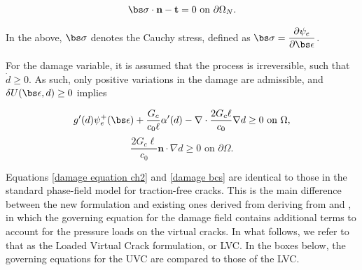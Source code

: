 \begin{equation}\label{disp bcs}
    \bs\sigma \cdot \textbf{n} - \textbf{t} = 0 \text{ on }\partial\Omega_N.
\end{equation}

\noindent In the above, $\bs\sigma$ denotes the Cauchy stress, defined as $\bs\sigma = \dfrac{\partial\psi_e}{\partial \bs \epsilon}$. 

For the damage variable, it is assumed that the process is irreversible, such that $\dot{d} \ge 0$.  As such, only positive variations in the damage are admissible, and $\delta U(\bs\epsilon, d) \ge 0$ implies

\begin{equation}\label{damage equation ch2}
    g'(d) \psi_e^+(\bs\epsilon)
    + \dfrac{G_c}{c_0\ell}\alpha'(d) - \nabla \cdot \dfrac{2G_c\ell}{c_0}\nabla d \ge 0 \text{ on }\Omega,
\end{equation}
\begin{equation}\label{damage bcs}
    \dfrac{2G_c\ell}{c_0}\textbf{n}\cdot \nabla d \ge 0 \text{ on }\partial\Omega.
\end{equation}

\noindent Equations \eqref{damage equation ch2} and \eqref{damage bcs} are identical to those in the standard phase-field model for traction-free cracks. This is the main difference between the new formulation and existing ones derived from deriving from \cite{bourdin2012variational} and \cite{wheeler2014augmented}, in which the governing equation for the damage field contains additional terms to account for the pressure loads on the virtual cracks. In what follows, we refer to that as the Loaded Virtual Crack formulation, or LVC.  In the boxes below, the governing equations for the UVC are compared to those of the LVC.  

